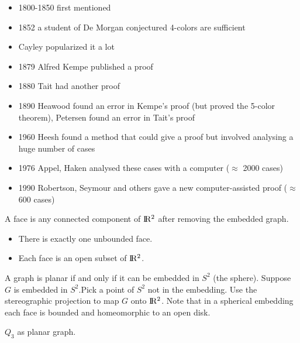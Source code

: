 \begin {itemize}
\item 1800-1850 first mentioned
\item 1852 a student of De Morgan conjectured 4-colors are sufficient
\item Cayley popularized it a lot
\item 1879 Alfred Kempe published a proof
\item 1880 Tait had another proof
\item 1890 Heawood found an error in Kempe's proof (but proved the 5-color theorem), 
                  Petersen found an error in Tait's proof
\item 1960 Heesh found a method that could give a proof but involved analysing a huge number of cases
\item 1976 Appel, Haken analysed these cases with a computer ($\approx$ 2000 cases)
\item 1990 Robertson, Seymour and others gave a new computer-assisted proof ($\approx$ 600 cases)
\end {itemize}
\bigskip
\begin {definition} A face is any connected component of ${\rm I\!R^2}$  after removing the embedded graph.
\end {definition}
\begin {observation}\begin{minipage}[t]{\linewidth}
\begin {itemize}
\item There is exactly one unbounded face.
\item Each face is an open subset of ${\rm I\!R^2}$.
\end {itemize}
\end {minipage}
\end {observation}
\begin {observation}
A graph is planar if and only if it can be embedded in ${S^2}$ (the sphere).
Suppose {$G$} is embedded in ${S^2}$.Pick a point of ${S^2}$ not in the embedding.
Use the stereographic projection to map {$G$} onto ${\rm I\!R^2}$.
Note that in a spherical embedding each face is bounded and homeomorphic to an open disk.
\end {observation}
\bigskip
\bigskip
\begin {example} {$Q_3$} as planar graph.
\end {example}

